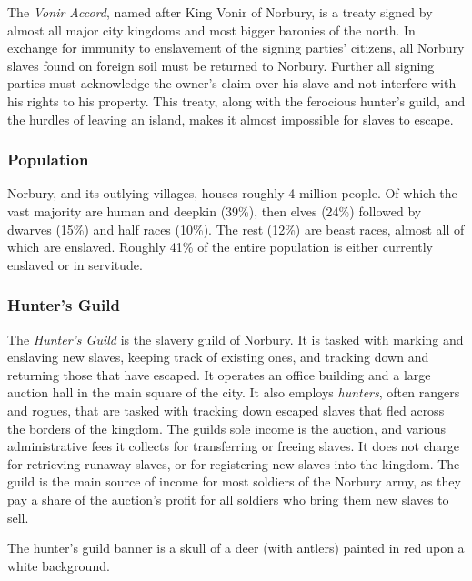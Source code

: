 The \emph{Vonir Accord}, named after King Vonir of Norbury, is a treaty signed
by almost all major city kingdoms and most bigger baronies of the north. In
exchange for immunity to enslavement of the signing parties' citizens, all
Norbury slaves found on foreign soil must be returned to Norbury. Further all
signing parties must acknowledge the owner's claim over his slave and not
interfere with his rights to his property. This treaty, along with the
ferocious hunter's guild, and the hurdles of leaving an island, makes it almost
impossible for slaves to escape.

\subsubsection*{Population}

Norbury, and its outlying villages, houses roughly 4 million people. Of which
the vast majority are human and deepkin (39\%), then elves (24\%) followed by
dwarves (15\%) and half races (10\%). The rest (12\%) are beast races, almost
all of which are enslaved. Roughly 41\% of the entire population is either
currently enslaved or in servitude.

\subsubsection*{Hunter's Guild}

The \emph{Hunter's Guild} is the slavery guild of Norbury. It is tasked with
marking and enslaving new slaves, keeping track of existing ones, and tracking
down and returning those that have escaped. It operates an office building and
a large auction hall in the main square of the city. It also employs
\emph{hunters}, often rangers and rogues, that are tasked with tracking down
escaped slaves that fled across the borders of the kingdom. The guilds sole
income is the auction, and various administrative fees it collects for
transferring or freeing slaves. It does not charge for retrieving runaway
slaves, or for registering new slaves into the kingdom. The guild is the main
source of income for most soldiers of the Norbury army, as they pay a share of
the auction's profit for all soldiers who bring them new slaves to sell.

The hunter's guild banner is a skull of a deer (with antlers) painted in red
upon a white background.
